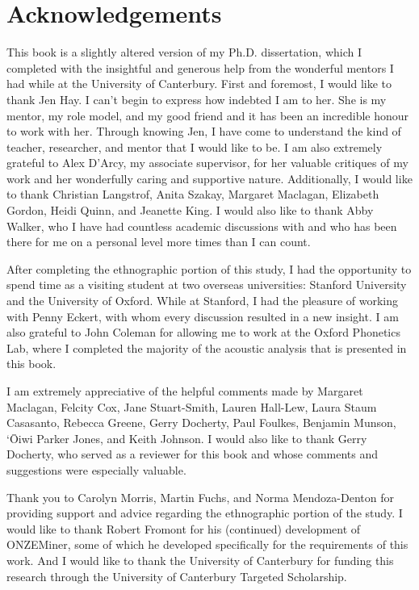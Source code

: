 \section*{Acknowledgements}

\noindent This book is a slightly altered version of my Ph.D. dissertation, which I completed with the insightful and generous help from the wonderful mentors I had while at the University of Canterbury.  First and foremost, I would like to thank Jen Hay.  I can't begin to express how indebted I am to her.  She is my mentor, my role model, and my good friend and it has been an incredible honour to work with her.  Through knowing Jen, I have come to understand the kind of teacher, researcher, and mentor that I would like to be.  I am also extremely grateful to Alex D'Arcy, my associate supervisor, for her valuable critiques of my work and her wonderfully caring and supportive nature.  Additionally, I would like to thank Christian Langstrof, Anita Szakay, Margaret Maclagan, Elizabeth Gordon, Heidi Quinn, and Jeanette King.  I would also like to thank Abby Walker, who I have had countless academic discussions with and who has been there for me on a personal level more times than I can count.

After completing the ethnographic portion of this study, I had the opportunity to spend time as a visiting student at two overseas universities: Stanford University and the University of Oxford.  While at Stanford, I had the pleasure of working with Penny Eckert, with whom every discussion resulted in a new insight.  I am also grateful to John Coleman for allowing me to work at the Oxford Phonetics Lab, where I completed the majority of the acoustic analysis that is presented in this book.  

I am extremely appreciative of the helpful comments made by Margaret Maclagan, Felcity Cox, Jane Stuart-Smith, Lauren Hall-Lew, Laura Staum Casasanto, Rebecca Greene, Gerry Docherty, Paul Foulkes, Benjamin Munson, `\=Oiwi Parker Jones, and Keith Johnson.  I would also like to thank Gerry Docherty, who served as a reviewer for this book and whose comments and suggestions were especially valuable.

Thank you to Carolyn Morris, Martin Fuchs, and Norma Men\-doza-Den\-ton for providing support and advice regarding the ethnographic portion of the study.  I would like to thank Robert Fromont for his (continued) development of ONZEMiner, some of which he developed specifically for the requirements of this work.  And I would like to thank the University of Canterbury for funding this research through the University of Canterbury Targeted Scholarship.

